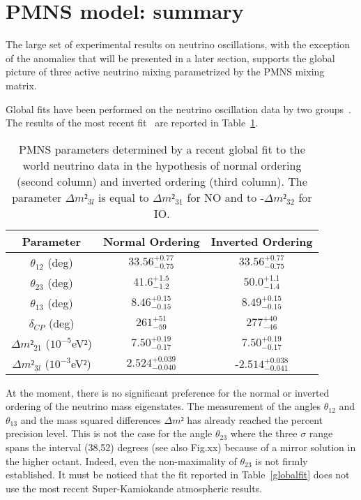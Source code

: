 \section{ PMNS model: summary}
\label{sec:summary}


The large set of experimental results on neutrino oscillations, with the exception of the anomalies that will be presented in a later section, supports the global picture of three active neutrino mixing parametrized by the PMNS mixing matrix.

Global fits have been performed on the neutrino oscillation data by two groups~\cite{nufit,fogli}.
The results of the most recent fit~\cite{nufit} are reported in Table~\ref{tab:globalfit}.


\begin{table}
\centering
\begin{tabular}{|c|c|c|}
  \hline
  Parameter & Normal Ordering & Inverted Ordering  \\ 
  \hline
$\theta_{12}$ (deg)& $33.56^{+0.77}_{-0.75}$ &  $33.56^{+0.77}_{-0.75}$\\  
  $\theta_{23}$ (deg)& $41.6^{+1.5}_{-1.2}$ &  $50.0^{+1.1}_{-1.4}$\\  
  $\theta_{13}$ (deg)& $8.46^{+0.15}_{-0.15}$ & $8.49^{+0.15}_{-0.15}$ \\  
  $\delta_{CP}$ (deg)&  $261^{+51}_{-59}$& $277^{+40}_{-46}$ \\  
  $\Delta m²_{21}$ ($10^{-5}$eV$²$)& $7.50^{+0.19}_{-0.17}$ & $7.50^{+0.19}_{-0.17}$ \\  
  $\Delta m²_{3l}$ ($10^{-3}$eV$²$)&  $2.524^{+0.039}_{-0.040}$&  -$2.514^{+0.038}_{-0.041}$\\  
  \hline
\end{tabular}
\caption{
PMNS parameters determined by a recent global fit to the world neutrino data \cite{nufit} in the hypothesis of normal ordering (second column) and inverted ordering (third column). The parameter $\Delta m²_{3l}$ is equal to $\Delta m²_{31}$ for NO and to -$\Delta m²_{32}$ for IO. }
\label{tab:globalfit}
\end{table}


At the moment, there is no significant preference for the normal or inverted ordering of the neutrino mass eigenstates. The measurement of the angles $\theta_{12}$ and 
$\theta_{13}$ and the mass squared differences $\Delta m² $ has already reached the percent precision level. This is not the case for the angle $\theta_{23}$ where the three $\sigma$ range spans the interval (38,52) degrees (see also Fig.xx) because of a mirror solution in the higher octant. Indeed, even the non-maximality of $\theta_{23}$ is not firmly established. It must be noticed that the fit reported in Table~\ref{globalfit} does not use the most recent Super-Kamiokande atmospheric results. 

